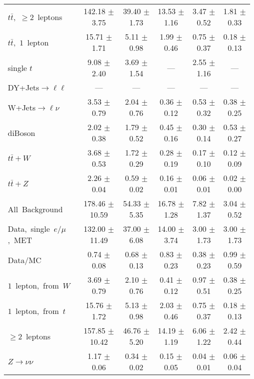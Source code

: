 \documentclass{article}
\begin{document}
\begin{longtable}{|l|c|c|c|c|c|}
$t\bar{t}$,~$\ge2$~leptons & 142.18 $\pm$ 3.75  & 39.40 $\pm$ 1.73  & 13.53 $\pm$ 1.16  & 3.47 $\pm$ 0.52  & 1.81 $\pm$ 0.33 \\* 
$t\bar{t}$,~$1$~lepton & 15.71 $\pm$ 1.71  & 5.11 $\pm$ 0.98  & 1.99 $\pm$ 0.46  & 0.75 $\pm$ 0.37  & 0.18 $\pm$ 0.13 \\* 
single $t$  & 9.08 $\pm$ 2.40  & 3.69 $\pm$ 1.54  & ---  & 2.55 $\pm$ 1.16  & --- \\* 
DY+Jets$\rightarrow\ell\ell$  & ---  & ---  & ---  & ---  & --- \\* 
W+Jets$\rightarrow\ell\nu$  & 3.53 $\pm$ 0.79  & 2.04 $\pm$ 0.76  & 0.36 $\pm$ 0.12  & 0.53 $\pm$ 0.32  & 0.38 $\pm$ 0.25 \\* 
diBoson  & 2.02 $\pm$ 0.38  & 1.79 $\pm$ 0.52  & 0.45 $\pm$ 0.16  & 0.30 $\pm$ 0.14  & 0.53 $\pm$ 0.27 \\* 
$t\bar{t}+W$  & 3.68 $\pm$ 0.53  & 1.72 $\pm$ 0.29  & 0.28 $\pm$ 0.19  & 0.17 $\pm$ 0.10  & 0.12 $\pm$ 0.09 \\* 
$t\bar{t}+Z$  & 2.26 $\pm$ 0.04  & 0.59 $\pm$ 0.02  & 0.16 $\pm$ 0.01  & 0.06 $\pm$ 0.01  & 0.02 $\pm$ 0.00 \\* 
\hline \hline 
All~Background  & 178.46 $\pm$ 10.59  & 54.33 $\pm$ 5.35  & 16.78 $\pm$ 1.28  & 7.82 $\pm$ 1.37  & 3.04 $\pm$ 0.52 \\* 
Data,~single~$e/\mu$,~MET  & 132.00 $\pm$ 11.49  & 37.00 $\pm$ 6.08  & 14.00 $\pm$ 3.74  & 3.00 $\pm$ 1.73  & 3.00 $\pm$ 1.73 \\* 
Data/MC  & 0.74 $\pm$ 0.08  & 0.68 $\pm$ 0.13  & 0.83 $\pm$ 0.23  & 0.38 $\pm$ 0.23  & 0.99 $\pm$ 0.59 \\* 
\hline \hline 
$1$~lepton,~from~$W$  & 3.69 $\pm$ 0.79  & 2.10 $\pm$ 0.76  & 0.41 $\pm$ 0.12  & 0.97 $\pm$ 0.51  & 0.38 $\pm$ 0.25 \\* 
$1$~lepton,~from~$t$  & 15.76 $\pm$ 1.72  & 5.13 $\pm$ 0.98  & 2.03 $\pm$ 0.46  & 0.75 $\pm$ 0.37  & 0.18 $\pm$ 0.13 \\* 
$\ge2$~leptons  & 157.85 $\pm$ 10.42  & 46.76 $\pm$ 5.20  & 14.19 $\pm$ 1.19  & 6.06 $\pm$ 1.22  & 2.42 $\pm$ 0.44 \\* 
$Z\rightarrow\nu\nu$  & 1.17 $\pm$ 0.06  & 0.34 $\pm$ 0.02  & 0.15 $\pm$ 0.05  & 0.04 $\pm$ 0.01  & 0.06 $\pm$ 0.04 \\* 
\hline 
\end{longtable} 

 
 
 
 
\pagebreak 

 
 
\end{document}
